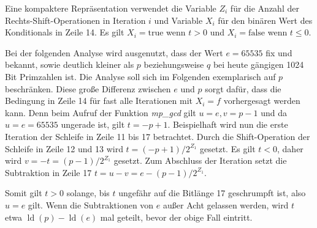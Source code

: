 Eine kompaktere Repräsentation verwendet die Variable $Z_i$ für die Anzahl der Rechts-Shift-Operationen in Iteration $i$ und
Variable $X_i$ für den binären Wert des Konditionals in Zeile 14. 
Es gilt $X_i=\text{true}$ wenn $t>0$ und $X_i = \text{false}$ wenn $t \leq 0$.

Bei der folgenden Analyse wird ausgenutzt, dass der Wert $e=65535$ fix und bekannt, sowie deutlich kleiner als $p$ beziehungsweise $q$ bei heute gängigen 1024 Bit Primzahlen ist.
Die Analyse soll sich im Folgenden exemplarisch auf $p$ beschränken.
Diese große Differenz zwischen $e$ und $p$ sorgt dafür, dass die Bedingung in Zeile 14 für fast alle Iterationen mit $X_i = f$ vorhergesagt werden kann.
Denn beim Aufruf der Funktion \textit{mp_gcd} gilt $u=e, v=p-1$ und da $u=e=65535$ ungerade ist, gilt $t=-p+1$.
Beispielhaft wird nun die erste Iteration der Schleife in Zeile 11 bis 17 betrachtet.
Durch die Shift-Operation der Schleife in Zeile 12 und 13 wird $t=(-p+1)/2^{Z_1}$ gesetzt.
Es gilt $t<0$, daher wird $v=-t=(p-1)/2^{Z_1}$ gesetzt. 
Zum Abschluss der Iteration setzt die Subtraktion in Zeile 17 $t=u-v=e-(p-1)/2^{Z_1}$.

Somit gilt $t>0$ solange, bis $t$ ungefähr auf die Bitlänge 17 geschrumpft ist, also $u=e$ gilt.
Wenn die Subtraktionen von $e$ außer Acht gelassen werden, wird $t$ etwa $\operatorname{ld}(p) - \operatorname{ld}(e)$ mal geteilt, bevor der obige Fall eintritt.

